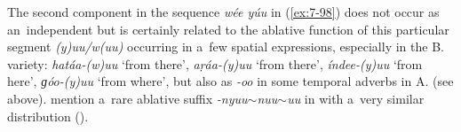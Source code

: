 The second component in the sequence \textit{wée yúu} in (\ref{ex:7-98}) does not occur as an~independent  but is certainly related to the ablative function of this particular segment \textit{(y)uu/w(uu)} occurring in a~few spatial expressions, especially in the B. variety: \textit{hatáa-(w)uu} `from there', \textit{aṛáa-(y)uu} `from there', \textit{índee-(y)uu} `from here', \textit{ɡóo-(y)uu} `from where', but also as \textit{-oo} in some temporal adverbs in A. (see  above). \citeauthor{schmidtkohistani2001} mention a~rare ablative suffix \textit{-nyuu$\sim$nuu$\sim$uu} in   with a~very similar distribution (\citeyear[130]{schmidtkohistani2001}).